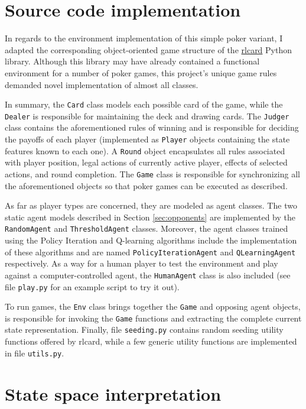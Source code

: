 \begin{appendices}
\section{Source code implementation}
\label{app:source}

In regards to the environment implementation of this simple poker variant, I adapted the corresponding object-oriented game structure of the \href{https://rlcard.org/}{rlcard} Python library. Although this library may have already contained a functional environment for a number of poker games, this project's unique game rules demanded novel implementation of almost all classes.

In summary, the \Verb|Card| class models each possible card of the game, while the \Verb|Dealer| is responsible for maintaining the deck and drawing cards. The \Verb|Judger| class contains the aforementioned rules of winning and is responsible for deciding the payoffs of each player (implemented as \Verb|Player| objects containing the state features known to each one). A \Verb|Round| object encapsulates all rules associated with player position, legal actions of currently active player, effects of selected actions, and round completion. The \Verb|Game| class is responsible for synchronizing all the aforementioned objects so that poker games can be executed as described.

As far as player types are concerned, they are modeled as agent classes. The two static agent models described in Section \ref{sec:opponents} are implemented by the \Verb|RandomAgent| and \Verb|ThresholdAgent| classes. Moreover, the agent classes trained using the Policy Iteration and Q-learning algorithms include the implementation of these algorithms and are named \Verb|PolicyIterationAgent| and \Verb|QLearningAgent| respectively. As a way for a human player to test the environment and play against a computer-controlled agent, the \Verb|HumanAgent| class is also included (see file \Verb|play.py| for an example script to try it out).

To run games, the \Verb|Env| class brings together the \Verb|Game| and opposing agent objects, is responsible for invoking the \Verb|Game| functions and extracting the complete current state representation. Finally, file \Verb|seeding.py| contains random seeding utility functions offered by rlcard, while a few generic utility functions are implemented in file \Verb|utils.py|.

\section{State space interpretation}
\label{app:states}


\end{appendices}
